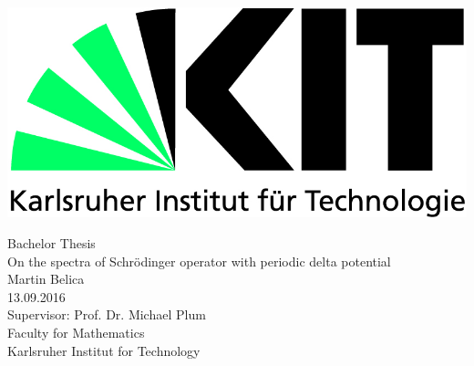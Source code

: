 \begin{titlepage}

    \includegraphics[scale=0.45,left]{kit-logo.jpg}  \\[2.5cm] 

	\begin{center}
 		{\Large Bachelor Thesis} \\[1cm] 
    
    	{\Huge On the spectra of Schrödinger operator with periodic delta potential} \\[1.5cm]

    	{\Large Martin Belica} \\[0.25cm]
    	{\Large 13.09.2016} \\[3.5cm]


    	{\Large Supervisor: Prof. Dr. Michael Plum} \\[0.75cm]
    	{\Large Faculty for Mathematics} \\[0.75cm]
    	{\Large Karlsruher Institut for Technology} \vfill 
  \end{center}

\end{titlepage}
